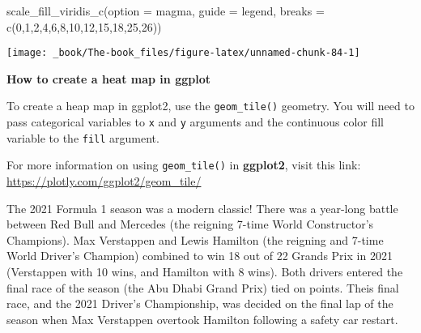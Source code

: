 \documentclass[
]{book}
\newenvironment{Shaded}{\begin{snugshade}}{\end{snugshade}}
\newcommand{\AttributeTok}[1]{\textcolor[rgb]{0.77,0.63,0.00}{#1}}
\newcommand{\DecValTok}[1]{\textcolor[rgb]{0.00,0.00,0.81}{#1}}
\newcommand{\FunctionTok}[1]{\textcolor[rgb]{0.00,0.00,0.00}{#1}}
\newcommand{\NormalTok}[1]{#1}
\newcommand{\StringTok}[1]{\textcolor[rgb]{0.31,0.60,0.02}{#1}}
\begin{document}
\begin{Shaded}
\begin{Highlighting}[]
  \FunctionTok{scale\_fill\_viridis\_c}\NormalTok{(}\AttributeTok{option =} \StringTok{\textquotesingle{}magma\textquotesingle{}}\NormalTok{,}
                       \AttributeTok{guide =} \StringTok{\textquotesingle{}legend\textquotesingle{}}\NormalTok{,}
                       \AttributeTok{breaks =} \FunctionTok{c}\NormalTok{(}\DecValTok{0}\NormalTok{,}\DecValTok{1}\NormalTok{,}\DecValTok{2}\NormalTok{,}\DecValTok{4}\NormalTok{,}\DecValTok{6}\NormalTok{,}\DecValTok{8}\NormalTok{,}\DecValTok{10}\NormalTok{,}\DecValTok{12}\NormalTok{,}\DecValTok{15}\NormalTok{,}\DecValTok{18}\NormalTok{,}\DecValTok{25}\NormalTok{,}\DecValTok{26}\NormalTok{))}
\end{Highlighting}
\end{Shaded}

\begin{center}\texttt{[image: \_book/The-book\_files/figure-latex/unnamed-chunk-84-1]} \end{center}

\begin{blackbox}

\begin{center}
\textbf{How to create a heat map in ggplot}

\end{center}

To create a heap map in ggplot2, use the \texttt{geom\_tile()} geometry. You will need to pass categorical variables to \texttt{x} and \texttt{y} arguments and the continuous color fill variable to the \texttt{fill} argument.

For more information on using \texttt{geom\_tile()} in \textbf{ggplot2}, visit this link: \url{https://plotly.com/ggplot2/geom_tile/}

\end{blackbox}

The 2021 Formula 1 season was a modern classic! There was a year-long battle between Red Bull and Mercedes (the reigning 7-time World Constructor's Champions). Max Verstappen and Lewis Hamilton (the reigning and 7-time World Driver's Champion) combined to win 18 out of 22 Grands Prix in 2021 (Verstappen with 10 wins, and Hamilton with 8 wins). Both drivers entered the final race of the season (the Abu Dhabi Grand Prix) tied on points. Theis final race, and the 2021 Driver's Championship, was decided on the final lap of the season when Max Verstappen overtook Hamilton following a safety car restart.
\end{document}
